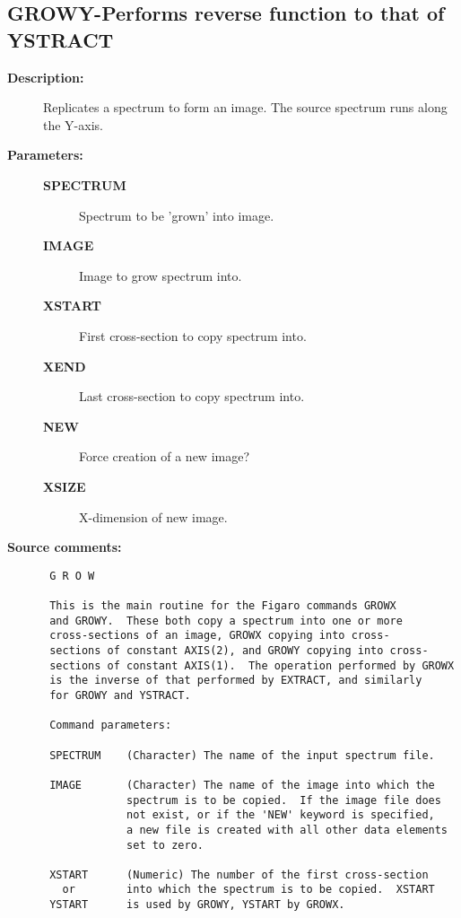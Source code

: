 \subsection{GROWY-\label{GROWY}Performs reverse function to that of YSTRACT}
\begin{description}

\item [{\bf Description:}]
 Replicates a spectrum to form an image.  The source spectrum
 runs along the Y-axis.

\item [{\bf Parameters:}]
\begin{description}
\item [{\bf SPECTRUM}]
 Spectrum to be 'grown' into image.
\item [{\bf IMAGE}]
 Image to grow spectrum into.
\item [{\bf XSTART}]
 First cross-section to copy spectrum into.
\item [{\bf XEND}]
 Last cross-section to copy spectrum into.
\item [{\bf NEW}]
 Force creation of a new image?
\item [{\bf XSIZE}]
 X-dimension of new image.
\end{description}

\item [{\bf Source comments:}]
\begin{verbatim}
 G R O W

 This is the main routine for the Figaro commands GROWX
 and GROWY.  These both copy a spectrum into one or more
 cross-sections of an image, GROWX copying into cross-
 sections of constant AXIS(2), and GROWY copying into cross-
 sections of constant AXIS(1).  The operation performed by GROWX
 is the inverse of that performed by EXTRACT, and similarly
 for GROWY and YSTRACT.

 Command parameters:

 SPECTRUM    (Character) The name of the input spectrum file.

 IMAGE       (Character) The name of the image into which the
             spectrum is to be copied.  If the image file does
             not exist, or if the 'NEW' keyword is specified,
             a new file is created with all other data elements
             set to zero.

 XSTART      (Numeric) The number of the first cross-section
   or        into which the spectrum is to be copied.  XSTART
 YSTART      is used by GROWY, YSTART by GROWX.


\end{verbatim}
\end{description}
